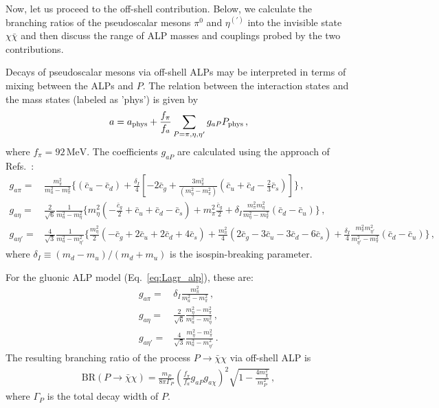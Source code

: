 \documentclass[aps,prd,preprintnumbers,superscriptaddress,nofootinbib,floatfix,twocolumn,notitlepage,reprint]{revtex4-2}
\newcommand{\BR}{\mathrm{BR}}
\newcommand{\MeV}{\mathrm{MeV}}
\begin{document}
Now, let us proceed to the off-shell contribution. 
Below, we calculate the branching ratios of the pseudoscalar mesons $\pi^{0}$ and $\eta^{(\prime)}$ into the invisible state $\chi\bar{\chi}$ and then discuss the range of ALP masses and couplings probed by the two contributions.

Decays of pseudoscalar mesons via off-shell ALPs may be interpreted in terms of mixing between the ALPs and $P$.
The relation between the interaction states and the mass states (labeled as 'phys') is given by
%
\begin{align}
    a 
    = 
    a_{\rm phys}+\frac{f_\pi}{f_a}\sum_{P=\pi,\eta,\eta'} g_{aP} P_{\text{phys}} \, ,
\end{align}
%
where $f_\pi=92\,\MeV$. 
The coefficients $g_{aP}$ are calculated using the approach of Refs.~\cite{Aloni:2018vki,Ovchynnikov:2025gpx,Balkin:2025enj}:
%
\begin{align}
    \label{eq:ALP-pi-generic}
    g_{a\pi} 
    =& 
    \frac{m_\pi^2}{m_a^2-m_\pi^2}
    \Bigg\{
    (\bar{c}_u-\bar{c}_d)
    +\frac{\delta_I}{4}\left[-2\bar{c}_g+\frac{3m_\pi^2}{(m_\eta^2-m_\pi^2)}\left(\bar{c}_u+\bar{c}_d-\frac{2}{3}\bar{c}_s\right)\right]
    \Bigg\}\, ,      
    \\
    \label{eq:ALP-eta-generic}
    g_{a\eta} 
    =&
    \frac{2}{\sqrt{6}}\frac{1}{m_a^2-m_\eta^2}
    \Bigg\{
    m_\eta^2\left(-\frac{\bar{c}_g}{2}+\bar{c}_u+\bar{c}_d-\bar{c}_s\right)
    +m_\pi^2\frac{\bar{c}_g}{2}
    +\delta_I\frac{m_\pi^2m_\eta^2}{m_\eta^2-m_\pi^2}\left(\bar{c}_d-\bar{c}_u\right) 
    \Bigg\}\, ,    
    \\
    \label{eq:ALP-etapr-generic}
    g_{a\eta'} 
    =& 
    \frac{4}{\sqrt{3}}\frac{1}{m_a^2-m_{\eta'}^2}
    \Bigg\{
    \frac{m_\eta^2}{2}\left(-\bar{c}_g+2\bar{c}_u+2\bar{c}_d+4\bar{c}_s\right)
    +\frac{m_\pi^2}{4}\left(2\bar{c}_g-3\bar{c}_u-3\bar{c}_d-6\bar{c}_s\right)
    +\frac{\delta_I}{4}\frac{m_\pi^2m_{\eta'}^2}{m_{\eta'}^2-m_\pi^2}\left(\bar{c}_d-\bar{c}_u\right)\Bigg\} \, , 
\end{align}
%
where $\delta_I\equiv(m_d-m_u)/(m_d+m_u)$ is the isospin-breaking parameter.

For the gluonic ALP model (Eq.~\eqref{eq:Lagr_alp}), these are:
%
\begin{align}
    g_{a\pi} 
    =& 
     \delta_I
    \frac{m_\pi^2}{m_a^2-m_\pi^2} \, , 
       \label{eq:ALP-pi} 
    \\
    g_{a\eta} 
    =&
    \frac{2}{\sqrt{6}}\frac{m_\eta^2-m_\pi^2}{m_a^2-m_\eta^2} \, ,    
    \label{eq:ALP-eta}
    \\
    g_{a\eta'} 
    =& 
    \frac{4}{\sqrt{3}}\frac{m_{\eta}^2-m_\pi^2}{m_a^2-m_{\eta'}^2} \, .     
    \label{eq:ALP-etapr}
\end{align}
%
The resulting branching ratio of the process $P\to\bar{\chi}\chi$ via off-shell ALP is 
%
\begin{align}
    \label{eq:off-shell-width}
    \BR(P\rightarrow\bar{\chi}\chi)
    = 
    \frac{m_P}{8\pi \Gamma_{P}}
    \left(\frac{f_\pi}{f_a}g_{aP}g_{a\chi}\right)^2
    \sqrt{1-\frac{4m_\chi^2}{m_P^2}}\, ,
\end{align}
%
where $\Gamma_{P}$ is the total decay width of $P$. 
\end{document}
